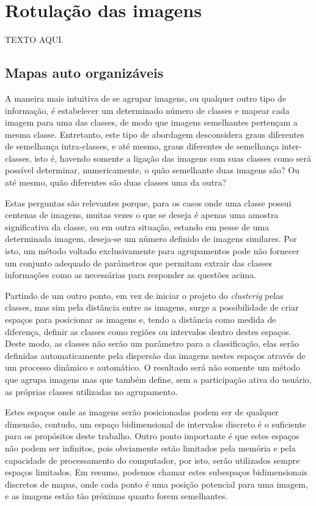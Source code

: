 \chapter{Rotulação das imagens}

TEXTO AQUI.

\section{Mapas auto organizáveis}\label{sec:mapas_aut_organizaveis}

A maneira mais intuitiva de se agrupar imagens, ou qualquer outro tipo de
informação, é estabelecer um determinado número de classes e mapear cada imagem
para uma das classes, de modo que imagens semelhantes pertençam a mesma classe.
Entretanto, este tipo de abordagem desconsidera graus diferentes de semelhança
intra-classes, e até mesmo, graus diferentes de semelhança inter-classes, isto
é, havendo somente a ligação das imagens com suas classes como será possível
determinar, numericamente, o quão semelhante duas imagens são? Ou até mesmo,
quão diferentes são duas classes uma da outra?

Estas perguntas são relevantes porque, para os casos onde uma classe possui
centenas de imagens, muitas vezes o que se deseja é apenas uma amostra
significativa da classe, ou em outra situação, estando em pesse de uma
determinada imagem, deseja-se um número definido de imagens similares. Por isto,
um método voltado exclusivamente para agrupamentos pode não fornecer um conjunto
adequado de parâmetros que permitam extrair das classes informações como as
necessárias para responder as questões acima.

Partindo de um outro ponto, em vez de iniciar o projeto do \textit{clusterig} pelas
classes, mas sim pela distância entre as imagens, surge a possibilidade de criar
espaços para posicionar as imagens e, tendo a distância como medida de
diferença, definir as classes como regiões ou intervalos dentro destes espaços.
Deste modo, as classes não serão um parâmetro para a classificação, elas serão
definidas automaticamente pela dispersão das imagens nestes espaços através de
um processo dinâmico e automático. O resultado será não somente um método que
agrupa imagens mas que também define, sem a participação ativa do usuário, as
próprias classes utilizadas no agrupamento.

Estes espaços onde as imagens serão posicionadas podem ser de qualquer dimensão,
contudo, um espaço bidimensional de intervalos discreto é o suficiente para os
propósitos deste trabalho. Outro ponto importante é que estes espaços não podem
ser infinitos, pois obviamente estão limitados pela memória e pela capacidade
de processamento do computador, por isto, serão utilizados sempre espaços
limitados. Em resumo, podemos chamar estes subespaços bidimensionais discretos
de mapas, onde cada ponto é uma posição potencial para uma imagem, e as imagens
estão tão próximas quanto forem semelhantes.

